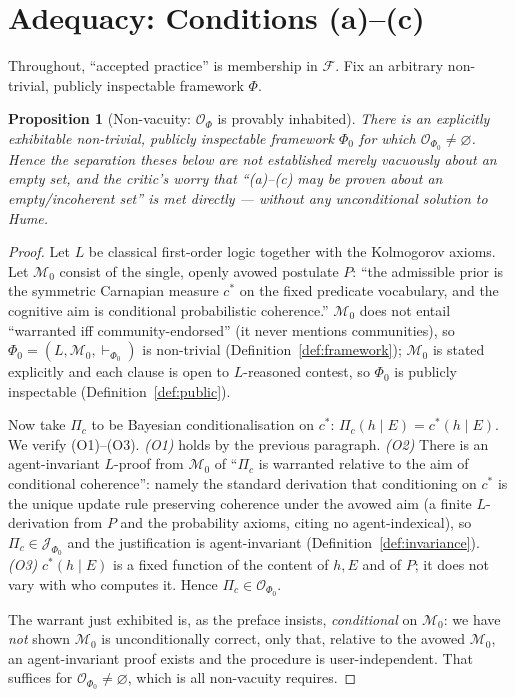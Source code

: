 \documentclass{amsart}
\theoremstyle{definition}
\theoremstyle{plain}
\newtheorem{proposition}{Proposition}
\theoremstyle{remark}
\begin{document}
\section{Adequacy: Conditions (a)--(c)}

Throughout, ``accepted practice'' is membership in $\mathcal{F}$. Fix an
arbitrary non-trivial, publicly inspectable framework $\Phi$.

\begin{proposition}[Non-vacuity: $\mathcal{O}_\Phi$ is provably inhabited]
\label{prop:nonempty}
There is an explicitly exhibitable non-trivial, publicly inspectable framework
$\Phi_0$ for which $\mathcal{O}_{\Phi_0}\neq\varnothing$. Hence the separation
theses below are not established merely \emph{vacuously} about an empty set, and
the critic's worry that ``(a)--(c) may be proven about an empty/incoherent set''
is met directly --- \emph{without} any unconditional solution to Hume.
\end{proposition}

\begin{proof}
Let $L$ be classical first-order logic together with the Kolmogorov axioms.
Let $\mathcal{M}_0$ consist of the single, openly avowed postulate $P$: ``the
admissible prior is the symmetric Carnapian measure $c^\ast$ on the fixed
predicate vocabulary, and the cognitive aim is conditional probabilistic
coherence.'' $\mathcal{M}_0$ does not entail ``warranted iff community-endorsed''
(it never mentions communities), so $\Phi_0=(L,\mathcal{M}_0,\vdash_{\Phi_0})$
is non-trivial (Definition~\ref{def:framework}); $\mathcal{M}_0$ is stated
explicitly and each clause is open to $L$-reasoned contest, so $\Phi_0$ is
publicly inspectable (Definition~\ref{def:public}).

Now take $\Pi_c$ to be Bayesian conditionalisation on $c^\ast$:
$\Pi_c(h\mid E)=c^\ast(h\mid E)$. We verify (O1)--(O3).
\emph{(O1)} holds by the previous paragraph.
\emph{(O2)} There is an agent-invariant $L$-proof from $\mathcal{M}_0$ of
``$\Pi_c$ is warranted relative to the aim of conditional coherence'': namely the
standard derivation that conditioning on $c^\ast$ is the unique update rule
preserving coherence under the avowed aim (a finite $L$-derivation from $P$ and
the probability axioms, citing no agent-indexical), so
$\Pi_c\in\mathcal{J}_{\Phi_0}$ and the justification is agent-invariant
(Definition~\ref{def:invariance}).
\emph{(O3)} $c^\ast(h\mid E)$ is a fixed function of the content of $h,E$ and of
$P$; it does not vary with who computes it. Hence
$\Pi_c\in\mathcal{O}_{\Phi_0}$.

The warrant just exhibited is, as the preface insists, \emph{conditional} on
$\mathcal{M}_0$: we have \emph{not} shown $\mathcal{M}_0$ is unconditionally
correct, only that, relative to the avowed $\mathcal{M}_0$, an agent-invariant
proof exists and the procedure is user-independent. That suffices for
$\mathcal{O}_{\Phi_0}\neq\varnothing$, which is all non-vacuity requires.
\end{proof}
\end{document}
